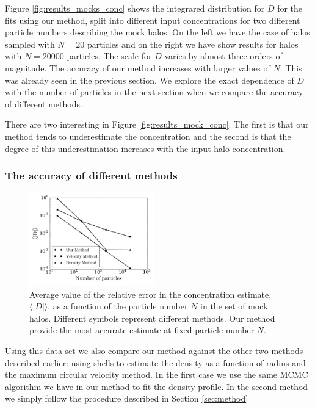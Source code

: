 \documentclass{emulateapj}
\newcommand{\avg}[1]{\langle{#1}\rangle}
\begin{document}
Figure \ref{fig:results_mocks_conc} shows the integrared distribution
for $D$ for the fits using our method, split into different input
concentrations for two different particle numbers describing the mock
halos. 
On the left we have the case of halos sampled with $N=20$ particles
and on the right we have show results for halos with $N=20000$
particles. 
The scale for $D$ varies by almost three orders of magnitude.
The accuracy of our method increases with larger values of $N$. 
This was already seen in the previous section. 
We explore the exact dependence of $D$ with the number of particles in
the next section when we compare the accuracy of different methods.

There are two interesting in Figure \ref{fig:results_mock_conc}. The
first is that our method tends to underestimate the concentration
and the second is that the degree of this underestimation increases
with the input halo concentration.

\subsubsection{The accuracy of different methods}

\begin{figure}
\begin{center}
  \includegraphics[width=0.48\textwidth]{error.pdf}
\end{center}
\caption{Average value of the relative error in the concentration
  estimate, $\avg{|D|}$, as a function of the particle number $N$ in
  the set of mock halos. Different symbols represent different
  methods. Our method provide the most accurate estimate at fixed
  particle number $N$.
    \label{fig:error}}
\end{figure}


Using this data-set we also compare our method against the other two
methods described earlier: using shells to estimate the density as a
function of radius and the maximum circular velocity method.
In the first case we use the same MCMC algorithm we
have in our method to fit the density profile.
In the second method we simply follow the procedure described in
Section \ref{sec:method}
\end{document}
